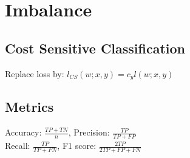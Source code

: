 \section*{Imbalance}

\subsection*{Cost Sensitive Classification}
Replace loss by: $l_{CS}(w;x,y) = c_y l(w;x,y)$

\subsection*{Metrics}
Accuracy: $\frac{TP+TN}{n}$, Precision: $\frac{TP}{TP+FP}$\\ Recall: $\frac{TP}{TP+FN}$, F1 score: $\frac{2TP}{2TP+FP+FN}$